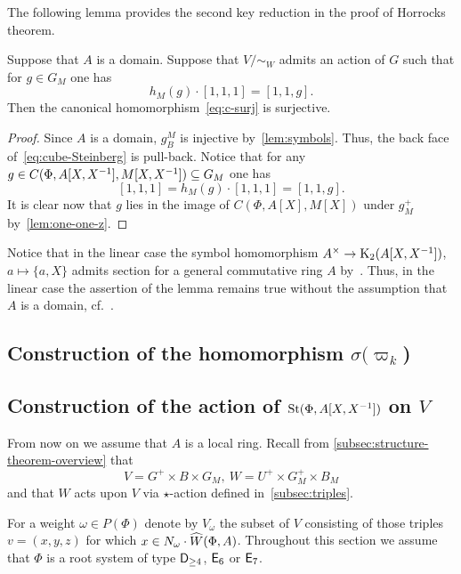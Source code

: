 The following lemma provides the second key reduction in the proof of Horrocks theorem.
\begin{lemma}
    Suppose that $A$ is a domain.
    Suppose that $V/\sim_W$ admits an action of $G$ such that
      for $g \in G_M$ one has \[ h_M(g) \cdot [1, 1, 1] = [1, 1, g]. \]
    Then the canonical homomorphism~\eqref{eq:c-surj} is surjective.
\end{lemma}
\begin{proof}
  Since $A$ is a domain, $g^M_B$ is injective by~\cref{lem:symbols}.
    Thus, the back face of~\eqref{eq:cube-Steinberg} is pull-back.
  Notice that for any $g \in C(\Phi, A[X, X^{-1}], M[X, X^{-1}]) \subseteq G_M$ one has
    \[ [1, 1, 1] = h_M(g) \cdot [1, 1, 1] = [1, 1, g].\]
  It is clear now that $g$ lies in the image of $C(\Phi, A[X], M[X])$ under $g^+_M$ by~\cref{lem:one-one-z}.
\end{proof}

\begin{rem}
    Notice that in the linear case the symbol homomorphism $A^\times \to \operatorname{K}_2(A[X, X^{-1}])$, $a \mapsto \{a, X\}$ admits section
     for a general commutative ring $A$ by~\cite{Wa71}.
    Thus, in the linear case the assertion of the lemma remains true without the assumption that $A$ is a domain, cf.~\cite[Lemma~3.1g]{Tu83}.
\end{rem}

\subsection{Construction of the homomorphism $\sigma(\varpi_k$)} \label{subsec:construction-sigma}


\subsection{Construction of the action of $\operatorname{St}(\Phi, A[X, X^{-1}])$ on $V$} \label{sec:construction-delta}
From now on we assume that $A$ is a local ring.
Recall from \cref{subsec:structure-theorem-overview} that \[V = G^+ \times B \times G_M,\ W = U^+ \times G_M^+ \times B_M\]
and that $W$ acts upon $V$ via $\star$-action defined in~\cref{subsec:triples}.

For a weight $\omega \in P(\Phi)$ denote by $V_\omega$ the subset of $V$ consisting of those triples $v = (x, y, z)$ for which $x \in N_\omega\cdot \widehat{W}(\Phi, A)$.
Throughout this section we assume that $\Phi$ is a root system of type $\mathsf{D}_{\geq 4}$, $\mathsf{E}_6$ or $\mathsf{E}_7$.

